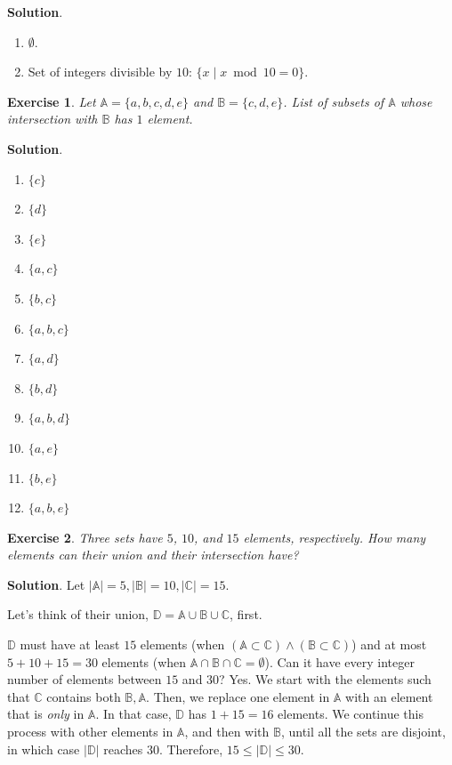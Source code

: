 \documentclass[11pt]{book}
\theoremstyle{definition}
\theoremstyle{plain}
\newtheorem{exercise}{Exercise}
\theoremstyle{definition}
\theoremstyle{problemstyle}
\theoremstyle{remark}
\theoremstyle{definition}
\begin{document}
\textbf{Solution}.
    \begin{enumerate}[label=\alph*)]
        \item $\emptyset$.
        \item Set of integers divisible by $10$: $\{x\mid x\bmod10=0\}$.
    \end{enumerate}
\begin{exercise}
    \label{ex:1.8.13}
    Let $\mathbb{A}=\{a,b,c,d,e\}$ and $\mathbb{B}=\{c,d,e\}$. List of subsets of $\mathbb{A}$ whose intersection with $\mathbb{B}$ has $1$ element.
\end{exercise}
\textbf{Solution}.
\begin{enumerate}
    \item $\{c\}$
    \item $\{d\}$
    \item $\{e\}$
    \item $\{a,c\}$
    \item $\{b,c\}$
    \item $\{a,b,c\}$
    \item $\{a,d\}$
    \item $\{b,d\}$
    \item $\{a,b,d\}$
    \item $\{a,e\}$
    \item $\{b,e\}$
    \item $\{a,b,e\}$
\end{enumerate}
\begin{exercise}
    \label{ex:1.8.14}
    Three sets have $5$, $10$, and $15$ elements, respectively. How many elements can their union and their intersection have?
\end{exercise}
\textbf{Solution}.
Let $\lvert\mathbb{A}\rvert=5,\lvert\mathbb{B}\rvert=10,\lvert\mathbb{C}\rvert=15$.

Let's think of their union, $\mathbb{D}=\mathbb{A}\cup\mathbb{B}\cup\mathbb{C}$, first. 

$\mathbb{D}$ must have at least $15$ elements (when $(\mathbb{A}\subset\mathbb{C})\land(\mathbb{B}\subset\mathbb{C})$) and at most $5+10+15=30$ elements (when $\mathbb{A}\cap\mathbb{B}\cap\mathbb{C}=\emptyset$). Can it have every integer number of elements between $15$ and $30$? Yes. We start with the elements such that $\mathbb{C}$ contains both $\mathbb{B},\mathbb{A}$. Then, we replace one element in $\mathbb{A}$ with an element that is \emph{only} in $\mathbb{A}$. In that case, $\mathbb{D}$ has $1+15=16$ elements. We continue this process with other elements in $\mathbb{A}$, and then with $\mathbb{B}$, until all the sets are disjoint, in which case $\lvert\mathbb{D}\rvert$ reaches $30$. Therefore, $15\leq\lvert\mathbb{D}\rvert\leq30$.
\end{document}
